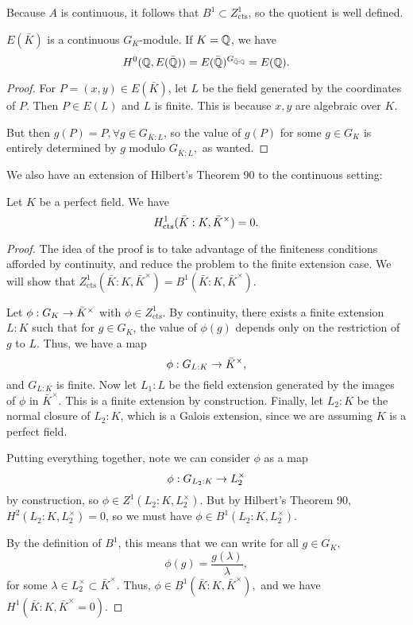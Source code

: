 \documentclass[12pt, a4paper]{report}
\begin{document}
\begin{remark}
  Because $A$ is continuous, it follows that $B^1 \subset Z^1_{\text{cts}}$, so
  the quotient is well defined.
\end{remark}

\begin{lemma}
  $E(\bar{K})$ is a continuous $G_K$-module.
  If $K = {\mathbb Q}$, we have 
  $$H^0({\mathbb Q},E(\bar{{\mathbb Q}})) = E(\bar{{\mathbb Q}})^{G_{\bar{{\mathbb Q}}:{\mathbb Q}}} = E({\mathbb Q}).$$
\end{lemma}
\begin{proof}
  For $P = (x,y) \in E(\bar{K})$, let $L$ be the field generated
  by the coordinates of $P$. Then $P \in E(L)$ and $L$ is finite. This is
  because $x, y$ are algebraic over $K$.

  But then $g (P) = P, \forall g \in G_{\bar{K} : L}$, so the value of $g(P)$
  for some $g \in G_K$ is entirely determined by $g$ modulo $G_{\bar{K}:L},$ as wanted.
\end{proof}

We also have an extension of Hilbert's Theorem 90 to the continuous setting:

\begin{thm}
  Let $K$ be a perfect field. We have
  \[H^1_\textnormal{cts}(\bar{K}:K, \bar{K}^\times) = 0.\]
\end{thm}

\begin{proof}
  The idea of the proof is to take advantage of the finiteness conditions
  afforded by continuity, and reduce the problem to the finite extension case.
  We will show that $Z^1_\text{cts} (\bar{K}:K, \bar{K}^\times) = B^1(\bar{K}:K,
  \bar{K}^\times).$

  Let $\phi : G_K \rightarrow \bar{K}^\times $ with $\phi \in Z^1_{\text{cts}}.$ By
  continuity, there exists a finite extension $L:K$ such that for $g \in G_K$,
  the value of $\phi(g)$ depends only on the restriction of $g$ to $L$. Thus, we
  have a map 
  \[\phi: G_{L:K} \rightarrow \bar{K}^\times, \]
  and $G_{L:K}$ is finite. Now let $L_1:L$ be the field extension generated
  by the images of $\phi$ in $\bar{K}^\times$. This is a finite extension by
  construction. Finally, let $L_2:K$ be the normal closure of $L_2:K$, which is a
  Galois extension, since we are assuming $K$ is a perfect field.

  Putting everything together, note we can consider $\phi$ as a map
  \[\phi: G_{L_2:K} \rightarrow L_2^\times\]
  by construction, so $\phi \in Z^1(L_2 : K, L_2^\times)$. But by Hilbert's
  Theorem 90, $H^2(L_2:K, L_2^\times) = 0$, so we must have $\phi \in B^1(L_2:K,
  L_2^\times).$
  
  By the definition of $B^1$, this means that we can write for all $g \in G_K,$ 
  \[\phi(g) = \frac{g(\lambda)}{\lambda},\]
  for some $\lambda \in L_2^\times \subset \bar{K}^\times.$
  Thus, $\phi \in B^1(\bar{K}:K, \bar{K}^\times),$ and we have $H^1(\bar{K}:K,
  \bar{K}^\times = 0).$


  
\end{proof}
  
\end{document}
